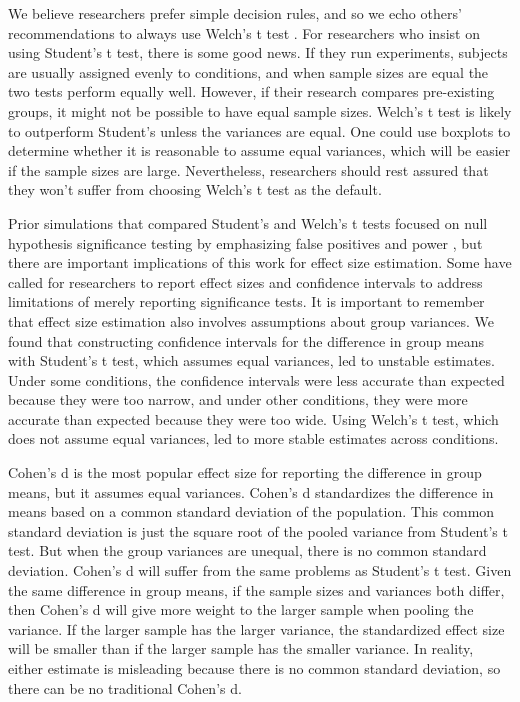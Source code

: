\documentclass[man, noextraspace, apacite, floatsintext]{apa6}
\begin{document}
    We believe researchers prefer simple decision rules, 
and so we echo others' recommendations to always use 
Welch's t test \cite{Zimmerman1996,Moser1992,Moser1989}. For researchers who 
insist on using Student's t test, there is some 
good news. If they run experiments, subjects are usually assigned evenly to 
conditions, and when sample sizes are equal the two tests perform equally well. 
However, if their research compares pre-existing groups, it 
might not be possible to have equal sample sizes. Welch's t test is likely to 
outperform Student's unless the variances are 
equal. One could use boxplots to 
determine whether it is reasonable to assume equal variances, which will be easier if the sample sizes are large. 
Nevertheless, researchers should rest assured that they won't suffer from choosing 
Welch's t test as the default.
    
    Prior simulations that compared Student's and Welch's t tests 
focused on null hypothesis significance testing by emphasizing false positives
and power \cite{Boneau1960, Neuhauser2002, Zimmerman1993, Zimmerman2004, 
Zimmerman1996, Zimmerman2009}, but there are important implications of this work
for effect size estimation. Some have called for researchers to report 
effect sizes and confidence intervals to address limitations of 
merely reporting significance tests. It is important to remember 
that effect size estimation also involves assumptions about group variances.
We found that constructing confidence intervals for the difference in group means with Student's t test,
which assumes equal variances, led to 
 unstable estimates. Under some conditions, the confidence intervals were 
less accurate than expected because they were too narrow, and under other 
conditions, they were more accurate than expected because they were too wide. 
Using Welch's t test, which does not assume equal variances, led 
to more stable estimates across conditions.
    
    Cohen's d \cite{Cohen1992} is the most popular effect size for reporting 
the difference in group means, but it assumes equal variances. Cohen's d standardizes the difference in means based on a 
common standard deviation of the population. This common standard deviation
is just the square root of the pooled variance from Student's t test.
But when the group variances are unequal, there is no common standard deviation. 
Cohen's d will suffer from the same problems as Student's t test. Given the same difference in group 
means, if the sample sizes and variances both differ, then Cohen's d will give more 
weight to the larger sample when pooling the variance. If the larger sample has the larger variance, the 
standardized effect size will be smaller than if the larger sample 
has the smaller variance. In reality, either estimate is misleading
because there is no common standard deviation, so there can be no traditional Cohen's d.
    
\end{document}
